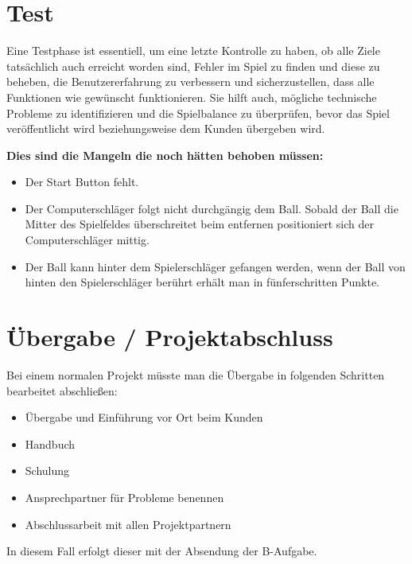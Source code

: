 \documentclass[a4paper,12pt]{article}
\begin{document}
\section{Test}
Eine Testphase ist essentiell, um eine letzte Kontrolle zu haben, ob alle Ziele tatsächlich auch erreicht worden sind, Fehler im Spiel zu finden und diese zu beheben, die Benutzererfahrung zu verbessern und sicherzustellen, dass alle Funktionen wie gewünscht funktionieren. Sie hilft auch, mögliche technische Probleme zu identifizieren und die Spielbalance zu überprüfen, bevor das Spiel veröffentlicht wird beziehungsweise dem Kunden übergeben wird. \par \vspace\baselineskip
\textbf{Dies sind die Mangeln die noch hätten behoben müssen:}
\begin{itemize}[noitemsep,topsep=0pt,parsep=0pt,partopsep=0pt]
    \item Der Start Button fehlt.
    \item Der Computerschläger folgt nicht durchgängig dem Ball. Sobald der Ball die Mitter des Spielfeldes überschreitet beim entfernen positioniert sich der Computerschläger mittig.
    \item Der Ball kann hinter dem Spielerschläger gefangen werden, wenn der Ball von hinten den Spielerschläger berührt erhält man in fünferschritten Punkte.
\end{itemize}
\section{Übergabe / Projektabschluss}
Bei einem normalen Projekt müsste man die Übergabe in folgenden Schritten bearbeitet abschließen: \par \vspace\baselineskip
\begin{itemize}[noitemsep,topsep=0pt,parsep=0pt,partopsep=0pt]
    \item Übergabe und Einführung vor Ort beim Kunden
    \item Handbuch
    \item Schulung
    \item Ansprechpartner für Probleme benennen
    \item Abschlussarbeit mit allen Projektpartnern
\end{itemize}
\vspace\baselineskip
In diesem Fall erfolgt dieser mit der Absendung der B-Aufgabe.
\clearpage
\end{document}
